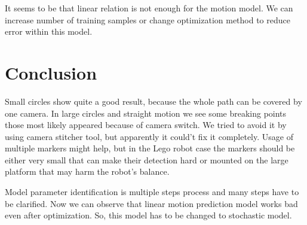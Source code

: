\documentclass[a4paper, 12pt]{article}
\begin{document}
It seems to be that linear relation is not enough for the motion model. We can increase number of training samples or change optimization method to reduce error within this model.

\section{Conclusion}

Small circles show quite a good result, because the whole path can be covered by one camera. In large circles and straight motion we see some breaking points those most likely appeared because of camera switch. We tried to avoid it by using camera stitcher tool, but apparently it could't fix it completely. Usage of multiple markers might help, but in the Lego robot case the markers should be either very small that can make their detection hard or mounted on the large platform that may harm the robot's balance.

\bigskip

Model parameter identification is multiple steps process and many steps have to be clarified. Now we can observe that linear motion prediction model works bad even after optimization. So, this model has to be changed to stochastic model.
\end{document}

